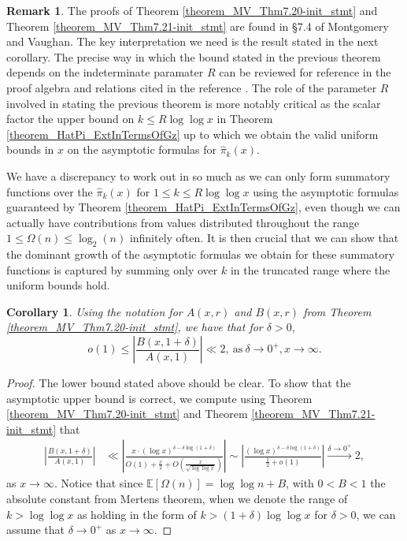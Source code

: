 \documentclass[11pt,reqno,a4letter]{article}
\numberwithin{figure}{section}
\numberwithin{table}{section}
\theoremstyle{plain}
\newtheorem{cor}[theorem]{Corollary}
\numberwithin{theorem}{section}
\theoremstyle{definition}
\newtheorem{remark}[theorem]{Remark}
\begin{document}
\begin{remark} 
The proofs of Theorem \ref{theorem_MV_Thm7.20-init_stmt} and 
Theorem \ref{theorem_MV_Thm7.21-init_stmt} 
are found in \S{7.4} of Montgomery and Vaughan. 
The key interpretation we need is the result stated in the next corollary. 
The precise way in which the bound 
stated in the previous theorem depends on the 
indeterminate paramater $R$ can be reviewed for reference in the proof 
algebra and relations cited in the reference \cite[\S 7]{MV}. 
The role of the parameter $R$ involved in stating the previous theorem 
is more notably critical as the scalar factor the upper bound on $k \leq R\log\log x$ in 
Theorem \ref{theorem_HatPi_ExtInTermsOfGz} up to which 
we obtain the valid uniform bounds in $x$ on the asymptotic formulas for 
$\widehat{\pi}_k(x)$. 

We have a discrepancy to work out in so much as we 
can only form summatory functions over the $\widehat{\pi}_k(x)$ for 
$1 \leq k \leq R\log\log x$ using the asymptotic formulas
guaranteed by Theorem \ref{theorem_HatPi_ExtInTermsOfGz}, even though we can actually 
have contributions from values distributed throughout the range $1 \leq \Omega(n) \leq \log_2(n)$ 
infinitely often. 
It is then crucial that we can show that the dominant growth of the asymptotic formulas we obtain 
for these summatory functions is captured by summing only over $k$ in the truncated range 
where the uniform bounds hold. 
\end{remark} 

\begin{cor} 
\label{theorem_MV_Thm7.20} 
Using the notation for $A(x, r)$ and $B(x, r)$ from 
Theorem \ref{theorem_MV_Thm7.20-init_stmt}, 
we have that for $\delta > 0$, 
\[
o(1) \leq \left\lvert \frac{B(x, 1+\delta)}{A(x, 1)} \right\rvert \ll 2, 
     \mathrm{\ as\ } \delta \rightarrow 0^{+}, x \rightarrow \infty. 
\]
\end{cor} 
\begin{proof} 
The lower bound stated above should be clear. To show that the asymptotic 
upper bound is correct, we compute using Theorem \ref{theorem_MV_Thm7.20-init_stmt} and 
Theorem \ref{theorem_MV_Thm7.21-init_stmt} that 
\begin{align*} 
\left\lvert \frac{B(x, 1+\delta)}{A(x, 1)} \right\rvert & \ll 
     \left\lvert \frac{x \cdot (\log x)^{\delta - \delta\log(1+\delta)}}{ 
     O(1) + \frac{x}{2} + 
     O\left(\frac{x}{\sqrt{\log\log x}}\right)} \right\rvert 
     \sim 
     \left\lvert \frac{(\log x)^{\delta - \delta\log(1+\delta)}}{ 
     \frac{1}{2} + o(1)}\right\rvert 
     \xrightarrow{\delta \rightarrow 0^{+}} 2, 
\end{align*} 
as $x \rightarrow \infty$. Notice that since $\mathbb{E}[\Omega(n)] = \log\log n + B$, with $0 < B < 1$ the 
absolute constant from Mertens theorem, 
when we denote the range of $k > \log\log x$ as holding in the form of 
$k > (1 + \delta) \log\log x$ for $\delta > 0$, we can assume that $\delta \rightarrow 0^{+}$ as 
$x \rightarrow \infty$. 
\end{proof} 
\end{document}
